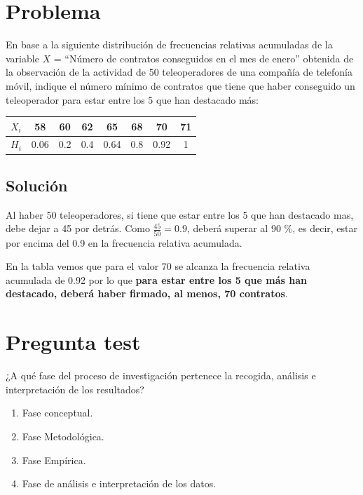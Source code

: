 \documentclass[
]{book}
\providecommand{\tightlist}{%
  \setlength{\itemsep}{0pt}\setlength{\parskip}{0pt}}
\begin{document}
\hypertarget{problema}{%
\section{Problema}\label{problema}}

En base a la siguiente distribución de frecuencias relativas acumuladas de la variable \(X\) = ``Número de contratos conseguidos en el mes de enero'' obtenida de la observación de la actividad de 50 teleoperadores de
una compañía de telefonía móvil, indique el número mínimo de contratos que tiene que haber conseguido un teleoperador para estar entre los 5 que han destacado más:

\begin{longtable}[]{@{}cccccccc@{}}
\toprule
\(X_i\) & 58 & 60 & 62 & 65 & 68 & 70 & 71\tabularnewline
\midrule
\endhead
\(H_i\) & 0.06 & 0.2 & 0.4 & 0.64 & 0.8 & 0.92 & 1\tabularnewline
\bottomrule
\end{longtable}

\hypertarget{soluciuxf3n}{%
\subsection{Solución}\label{soluciuxf3n}}

Al haber 50 teleoperadores, si tiene que estar entre los 5 que han destacado mas, debe dejar a 45 por detrás. Como \(\frac{45}{50}=0.9\), deberá superar al 90 \%, es decir, estar por encima del 0.9 en la frecuencia relativa acumulada.

En la tabla vemos que para el valor 70 se alcanza la frecuencia relativa acumulada de 0.92 por lo que \textbf{para estar entre los 5 que más han destacado, deberá haber firmado, al menos, 70 contratos}.

\hypertarget{pregunta-test-4}{%
\section{Pregunta test}\label{pregunta-test-4}}

¿A qué fase del proceso de investigación pertenece la recogida, análisis e interpretación de los resultados?

\begin{enumerate}
\def\labelenumi{\alph{enumi})}
\tightlist
\item
  Fase conceptual.
\item
  Fase Metodológica.
\item
  Fase Empírica.
\item
  Fase de análisis e interpretación de los datos.
\end{enumerate}
\end{document}
